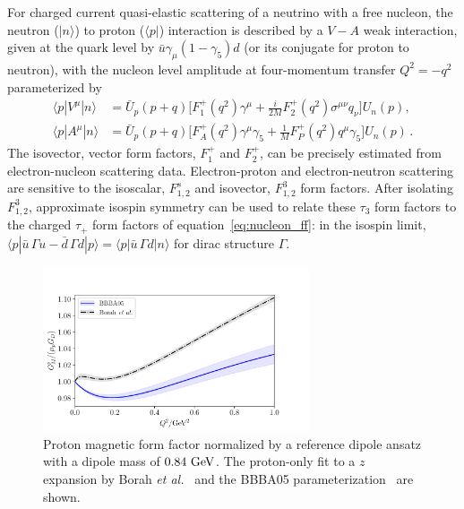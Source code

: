 For charged current quasi-elastic scattering of a neutrino with a free nucleon,
the neutron ($|n\rangle$) to proton ($\langle p|$)
interaction is described by a $V-A$ weak interaction, given at the quark level by
$\bar{u}\gamma_\mu(1- \gamma_5)d$ (or its conjugate for proton to neutron), with the nucleon level amplitude at four-momentum transfer $Q^2 = -q^2$ parameterized by
\begin{align}\label{eq:nucleon_ff}
\langle p | V^\mu | n \rangle
    &= \bar{U}_p(p+q) \Big[
        F_1^+(q^2) \gamma^\mu
        +\frac{i}{2M} F_2^+(q^2) \sigma^{\mu\nu} q_\nu
    \Big] U_n(p),
\nonumber\\
\langle p | A^\mu | n \rangle
    &= \bar{U}_p(p+q) \Big[
        F_A^+(q^2) \gamma^\mu \gamma_5
        +\frac{1}{M} F_P^+(q^2) q^\mu \gamma_5
    \Big] U_n(p)\, .
\end{align}
The isovector, vector form factors, $F_1^+$ and $F_2^+$, can be precisely estimated from electron-nucleon scattering data.
Electron-proton and electron-neutron scattering are sensitive to the isoscalar, $F_{1,2}^s$ and isovector, $F_{1,2}^3$ form factors.  After isolating $F_{1,2}^3$, approximate isospin symmetry can be used to relate these $\tau_3$ form factors to the charged $\tau_+$ form factors of equation~\eqref{eq:nucleon_ff}: in the isospin limit, $\langle p| \bar{u}\, \Gamma u - \bar{d}\, \Gamma d |p\rangle = \langle p| \bar{u}\, \Gamma d |n\rangle$ for dirac structure $\Gamma$.

\begin{figure}
 \centering
 \includegraphics[width=0.7\textwidth]{plots/proton_magnetic-standalone.pdf}
\caption{
Proton magnetic form factor normalized by a reference dipole ansatz
with a dipole mass of $0.84~{\rm GeV}$.
The proton-only fit to a $z$ expansion by Borah {\it et al.}~\cite{Borah:2020gte}
and the BBBA05 parameterization~\cite{Bradford:2006yz} are shown.
\label{fig:protonmagneticff}
}
\end{figure}

